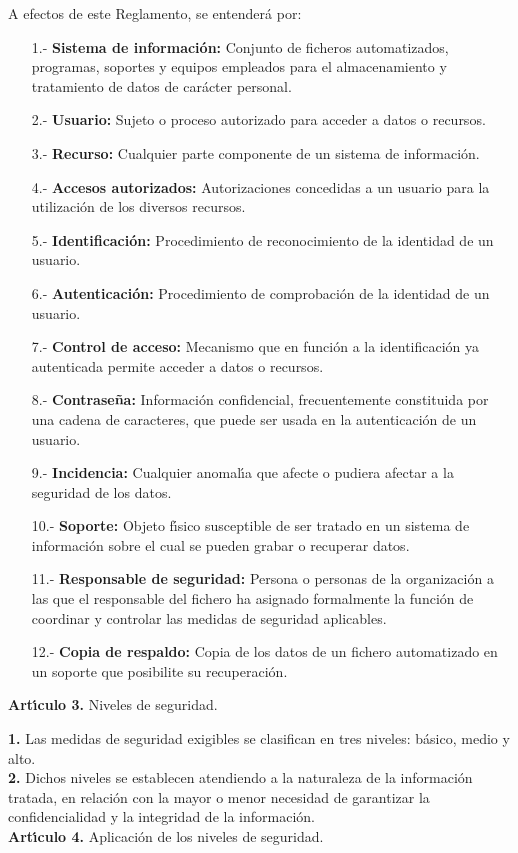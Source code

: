 A efectos de este Reglamento, se entender\'a por:
\begin{itemize}
\item[1.-]{\bf Sistema de informaci\'on:} Conjunto de ficheros automatizados, 
programas, soportes y equipos empleados para el almacenamiento y tratamiento de 
datos de car\'acter personal.
\item[2.-]{\bf Usuario:} Sujeto o proceso autorizado para acceder a datos o 
recursos.
\item[3.-]{\bf Recurso:} Cualquier parte componente de un sistema de 
informaci\'on.
\item[4.-]{\bf Accesos autorizados:} Autorizaciones concedidas a un usuario 
para la utilizaci\'on de los diversos recursos.
\item[5.-]{\bf Identificaci\'on:} Procedimiento de reconocimiento de la 
identidad de un usuario.
\item[6.-]{\bf Autenticaci\'on:} Procedimiento de comprobaci\'on de la 
identidad de un usuario.
\item[7.-]{\bf Control de acceso:} Mecanismo que en funci\'on a la 
identificaci\'on ya autenticada permite acceder a datos o recursos.
\item[8.-]{\bf Contrase\~na:} Informaci\'on confidencial, frecuentemente 
constituida por una cadena de caracteres, que puede ser usada en la 
autenticaci\'on de un usuario.
\item[9.-]{\bf Incidencia:} Cualquier anomal\'{\i}a que afecte o pudiera 
afectar a la seguridad de los datos.
\item[10.-]{\bf Soporte:} Objeto f\'{\i}sico susceptible de ser tratado en un 
sistema de informaci\'on sobre el cual se pueden grabar o recuperar datos.
\item[11.-]{\bf Responsable de seguridad:} Persona o personas de la 
organizaci\'on a las que el responsable del fichero ha asignado formalmente la 
funci\'on de coordinar y controlar las medidas de seguridad aplicables.
\item[12.-]{\bf Copia de respaldo:} Copia de los datos de un fichero 
automatizado en un soporte que posibilite su recuperaci\'on.
\end{itemize}
\vspace{0.3cm}
{\large {\bf Art\'{\i}culo 3.} Niveles de seguridad.}

{\bf 1.} Las medidas de seguridad exigibles se clasifican en tres niveles: 
b\'asico, medio y alto.\\

{\bf 2.} Dichos niveles se establecen atendiendo a la naturaleza de la 
informaci\'on tratada, en relaci\'on con la mayor o menor necesidad de 
garantizar la confidencialidad y la integridad de la informaci\'on.
\vspace{0.3cm}\\
{\large {\bf Art\'{\i}culo 4.} Aplicaci\'on de los niveles de seguridad.}

